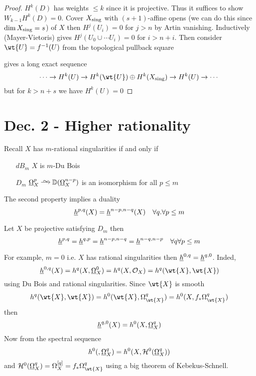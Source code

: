 \documentclass[12pt]{article}
\renewcommand{\cH}{\mathcal{H}}
\begin{document}
\begin{proof}
$H^k(D)$ has weights $\le k$ since it is projective. Thus it suffices to show $W_{k-1} H^k(D) = 0$. Cover $X_{\mathrm{sing}}$ with $(s+1)$-affine opens (we can do this since $\dim{X_{\mathrm{sing}}} = s$) of $X$ then $H^j(U_i) = 0$ for $j > n$ by Artin vanishing. Inductively (Mayer-Vietoris) gives $H^j(U_0 \cup \cdots U_i) = 0$ for $i > n + i$. Then consider $\wt{U} = f^{-1}(U)$ from the topological pullback square
\begin{center}
\end{center}
gives a long exact sequence
\[ \cdots \to H^k(U) \to H^k(\wt{U}) \oplus H^k(X_{\sing}) \to H^k(U) \to \cdots \]
but for $k > n + s$ we have $H^k(U) = 0$ 
\end{proof}

\section{Dec. 2 - Higher rationality}

Recall $X$ has $m$-rational singularities if and only if
\begin{enumerate}
\item[$dB_m$] $X$ is $m$-Du Bois
\item[$D_m$] $\ulO_X^p \iso \DD(\ulO_X^{n-p})$ is an isomorphism for all $p \le m$
\end{enumerate} 
The second property implies a duality
\[ \underline{h}^{p,q}(X) = \underline{h}^{n-p,n-q}(X) \quad \forall q. \forall p \le m \]

\begin{theorem}
Let $X$ be projective satisfying $D_m$ then
\[ \underline{h}^{p,q} = \underline{h}^{q,p} = \underline{h}^{n-p,n-q} = \underline{h}^{n-q,n-p} \quad \forall q \forall p \le m \]
\end{theorem}

\begin{rmk}
For example, $m = 0$ i.e. $X$ has rational singularities then $\underline{h}^{0,q} = \underline{h}^{q,0}$. Inded,
\[ \ul{h}^{0,q}(X) = h^q(X, \ulO_X^0) = h^q(X, \struct{X}) = h^q(\wt{X}, \wt{X}) \]
using Du Bois and rational singularities. Since $\wt{X}$ is smooth
\[ h^q(\wt{X}, \wt{X}) = h^0(\wt{X}, \Omega_{\wt{X}}^q) = h^0(X, f_* \Omega_{\wt{X}}^q) \]
then
\[ \underline{h}^{q,0}(X) = h^0(X, \underline{\Omega}_X^q) \]
Now from the spectral sequence
\[ h^0(, \ulO_X^q) = h^0(X, \cH^0(\ulO_X^q)) \]
and $\cH^0(\ulO_X^q) = \Omega_X^{[q]} = f_* \Omega_{\wt{X}}^q$ using a big theorem of Kebekus-Schnell. 
\end{rmk}
\end{document}
